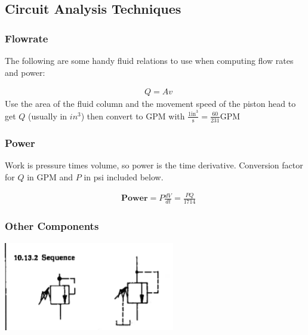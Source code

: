 \documentclass[11pt, fleqn]{article}
\begin{document}
\subsection{Circuit Analysis Techniques}
\subsubsection{Flowrate}
The following are some handy fluid relations to use when computing flow rates and power:

    \begin{align*}
        &Q = Av
    \end{align*}
Use the area of the fluid column and the movement speed of the piston head to get $Q$ (usually in $in^3$) then convert to GPM with $\frac{1 \text{in}^3}{\text{s}} = \frac{60}{231}\text{GPM}$

\subsubsection{Power}
Work is pressure times volume, so power is the time derivative.  Conversion factor for $Q$ in GPM and $P$ in psi included below.

    \begin{align*}
        &\textbf{Power} = P\frac{dV}{dt} = \frac{PQ}{1714}
    \end{align*}


\subsubsection{Other Components}

\includegraphics{Fluids/sequenceValves.png}\\
\end{document}
